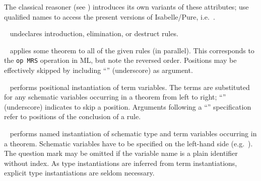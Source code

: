 \begin{isabellebody}
\begin{isamarkuptext}
\begin{description}
  The classical reasoner (see ) introduces its
  own variants of these attributes; use qualified names to access the
  present versions of Isabelle/Pure, i.e.\ \hyperlink{attribute.Pure.Pure.intro}{\mbox{}}.
  
  \item \hyperlink{attribute.rule}{\mbox{}}~ undeclares introduction,
  elimination, or destruct rules.
  
  \item \hyperlink{attribute.OF}{\mbox{}}~ applies some
  theorem to all of the given rules 
  (in parallel).  This corresponds to the \verb|op MRS| operation in
  ML, but note the reversed order.  Positions may be effectively
  skipped by including ``\isa{{\isacharunderscore}}'' (underscore) as argument.
  
  \item \hyperlink{attribute.of}{\mbox{}}~ performs positional
  instantiation of term variables.  The terms  are
  substituted for any schematic variables occurring in a theorem from
  left to right; ``\isa{{\isacharunderscore}}'' (underscore) indicates to skip a
  position.  Arguments following a ``'' specification
  refer to positions of the conclusion of a rule.
  
  \item \hyperlink{attribute.where}{\mbox{}}~
  performs named instantiation of schematic type and term variables
  occurring in a theorem.  Schematic variables have to be specified on
  the left-hand side (e.g.\ ).  The question mark may
  be omitted if the variable name is a plain identifier without index.
  As type instantiations are inferred from term instantiations,
  explicit type instantiations are seldom necessary.


\end{description}
\end{isamarkuptext}
\end{isabellebody}
